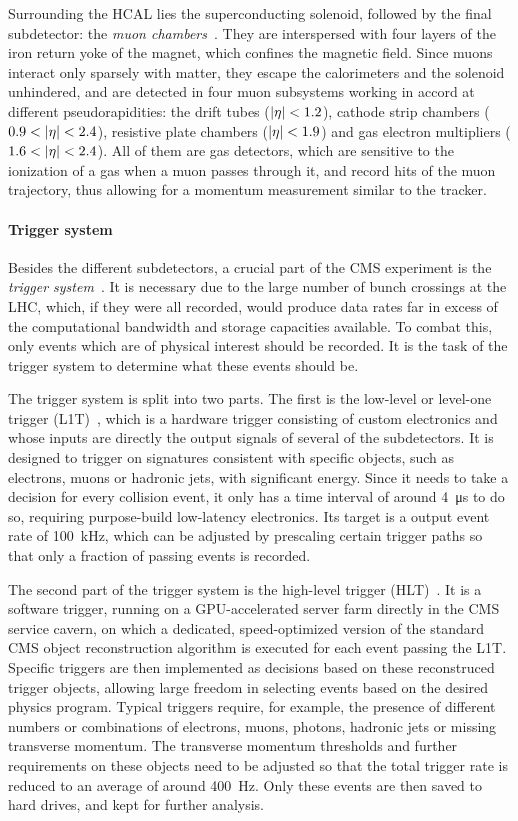 Surrounding the HCAL lies the superconducting solenoid, followed by the final subdetector: the \textit{muon chambers}~\cite{CMS:1997iti,Pozzobon:2701333}. They are interspersed with four layers of the iron return yoke of the magnet, which confines the magnetic field. Since muons interact only sparsely with matter, they escape the calorimeters and the solenoid unhindered, and are detected in four muon subsystems working in accord at different pseudorapidities: the drift tubes ($|\eta| < 1.2$), cathode strip chambers ($0.9 < |\eta| < 2.4$), resistive plate chambers ($|\eta| < 1.9$) and gas electron multipliers ($1.6 < |\eta| < 2.4$). All of them are gas detectors, which are sensitive to the ionization of a gas when a muon passes through it, and record hits of the muon trajectory, thus allowing for a momentum measurement similar to the tracker.

\paragraph{Trigger system}
Besides the different subdetectors, a crucial part of the CMS experiment is the \textit{trigger system}~\cite{CMS-TRG-12-001}. It is necessary due to the large number of bunch crossings at the LHC, which, if they were all recorded, would produce data rates far in excess of the computational bandwidth and storage capacities available. To combat this, only events which are of physical interest should be recorded. It is the task of the trigger system to determine what these events should be.

The trigger system is split into two parts. The first is the low-level or level-one trigger (L1T)~\cite{CMS:TRG-17-001}, which is a hardware trigger consisting of custom electronics and whose inputs are directly the output signals of several of the subdetectors. It is designed to trigger on signatures consistent with specific objects, such as electrons, muons or hadronic jets, with significant energy. Since it needs to take a decision for every collision event, it only has a time interval of around \SI{4}{\micro\second} to do so, requiring purpose-build low-latency electronics. Its target is a output event rate of 100~kHz, which can be adjusted by prescaling certain trigger paths so that only a fraction of passing events is recorded.

The second part of the trigger system is the high-level trigger (HLT)~\cite{CMSTrigger:2005yhe,Varghese:20232Q}. It is a software trigger, running on a GPU-accelerated server farm directly in the CMS service cavern, on which a dedicated, speed-optimized version of the standard CMS object reconstruction algorithm is executed for each event passing the L1T. Specific triggers are then implemented as decisions based on these reconstruced trigger objects, allowing large freedom in selecting events based on the desired physics program. Typical triggers require, for example, the presence of different numbers or combinations of electrons, muons, photons, hadronic jets or missing transverse momentum. The transverse momentum thresholds and further requirements on these objects need to be adjusted so that the total trigger rate is reduced to an average of around 400~Hz. Only these events are then saved to hard drives, and kept for further analysis.

